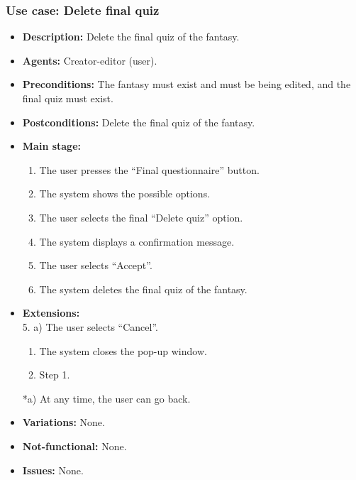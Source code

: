 \subsubsection{Use case: Delete final quiz}
\begin{itemize}
	\item \textbf{Description:} Delete the final quiz of the fantasy.
	\item \textbf{Agents:} Creator-editor (user).
	\item \textbf{Preconditions:} The fantasy must exist and must be being edited, and the final quiz must exist.
	\item \textbf{Postconditions:} Delete the final quiz of the fantasy.
	\item \textbf{Main stage:}
	\begin{enumerate}
		\item The user presses the ``Final questionnaire'' button.
		\item The system shows the possible options.
		\item The user selects the final ``Delete quiz'' option.
		\item The system displays a confirmation message.
		\item The user selects ``Accept''.
		\item The system deletes the final quiz of the fantasy.
	\end{enumerate}
	\item \textbf{Extensions:} \\ 5. a) The user selects ``Cancel''.
	\begin{enumerate}
		\item The system closes the pop-up window.
		\item Step 1.
	\end{enumerate}
	*a) At any time, the user can go back.
	\item \textbf{Variations:} None.
	\item \textbf{Not-functional:} None.
	\item \textbf{Issues:} None.
\end{itemize}

\newpage
